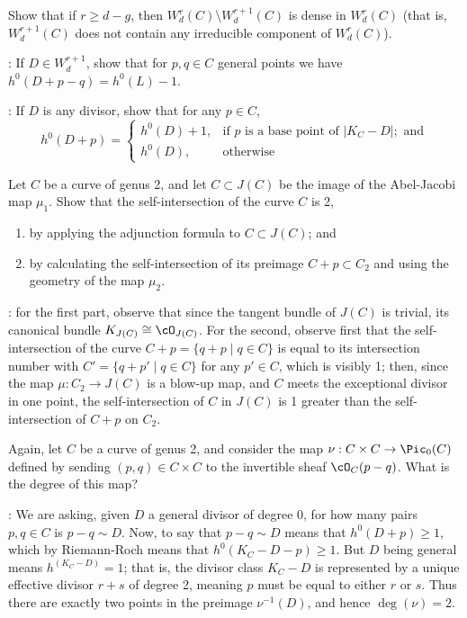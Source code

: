 \begin{exercise}
Show that if $r \geq d-g$, then $W^r_d(C) \setminus W^{r+1}_d(C)$ is dense in $W^r_d(C)$ (that is, $W^{r+1}_d(C)$ does not contain any irreducible component of $W^r_d(C)$).

: If $D \in W^{r+1}_d$, show that for $p, q \in C$ general points we have $h^0(D+p-q) = h^0(L) - 1$.

:  If $D$ is any divisor, show that for any $p \in C$,
$$
h^0(D+p) = 
\begin{cases}
h^0(D) + 1, &\text{if $p$ is a base point of } |K_C-D|; \text{ and} \\
h^0(D), &\text{otherwise}
\end{cases}
$$

\end{exercise}

\begin{exercise}
Let $C$ be a curve of genus 2, and let $C \subset J(C)$ be the image of the Abel-Jacobi map $\mu_1$. Show that the self-intersection of the curve $C$ is 2,
\begin{enumerate}
\item by applying the adjunction formula to $C \subset J(C)$; and
\item by calculating the self-intersection of its preimage $C + p \subset C_2$ and using the geometry of the map $\mu_2$.
\end{enumerate}

:  for the first part, observe that since the tangent bundle of $J(C)$ is trivial, its canonical bundle $K_{J(C)} \cong \cO_{J(C)}$. For the second, observe first that the self-intersection of the curve $C+p = \{q+p \mid q \in C\}$ is equal to its intersection number with $C' = \{q+p' \mid q \in C\}$ for any $p' \in C$, which is visibly 1; then, since the map $\mu : C_2 \to J(C)$ is a blow-up map, and $C$ meets the exceptional divisor in one point, the self-intersection of $C$ in $J(C)$ is 1 greater than the self-intersection of $C+p$ on $C_2$.
\end{exercise}



\begin{exercise}
Again, let $C$ be a curve of genus 2, and consider the map $\nu : C \times C \to \Pic_0(C)$ defined by sending $(p, q)\in C \times C$ to the invertible sheaf $\cO_C(p-q)$. What is the degree of this map?

: We are asking, given $D$ a general divisor  of degree 0, for how many pairs $p, q \in C$ is $p-q \sim D$. Now, to say that   $p-q \sim D$ means that $h^0(D+p) \geq 1$, which by Riemann-Roch means that $h^0(K_C-D-p) \geq 1$. But $D$ being general means $h^(K_C - D) = 1$; that is, the divisor class $K_C - D$ is represented by a unique effective divisor $r+s$ of degree 2, meaning $p$ must be equal to either $r$ or $s$. Thus there are exactly two points in the preimage $\nu^{-1}(D)$, and hence $\deg(\nu) = 2$.
\end{exercise}

